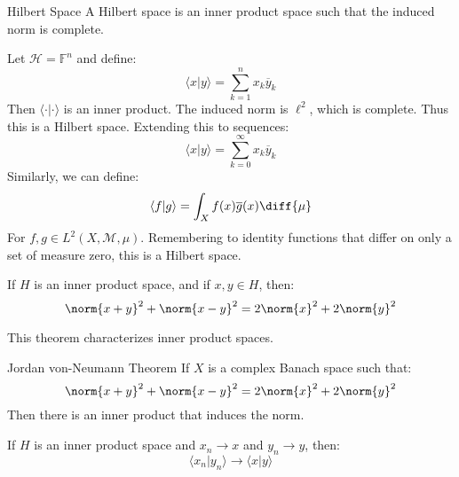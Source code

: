 \documentclass[crop=false,class=book,oneside]{standalone}                      %
\begin{document}
        \begin{ldefinition}{Hilbert Space}
            A Hilbert space is an inner product space
            such that the induced norm is complete.
        \end{ldefinition}
        \begin{lexample}
            Let $\mathcal{H}=\mathbb{F}^{n}$ and define:
            \begin{equation}
                \langle{x|y}\rangle
                =\sum_{k=1}^{n}x_{k}\overline{y}_{k}
            \end{equation}
            Then $\langle{\cdot|\cdot}\rangle$ is an inner product.
            The induced norm is $\ell^{2}$, which is complete.
            Thus this is a Hilbert space. Extending this to
            sequences:
            \begin{equation}
                \langle{x|y}\rangle
                =\sum_{k=0}^{\infty}x_{k}\overline{y}_{k}
            \end{equation}
            Similarly, we can define:
            \begin{equation}
                \langle{f|g}\rangle
                =\int_{X}f(x)\overline{g}(x)\diff{\mu}
            \end{equation}
            For $f,g\in{L}^{2}(X,\mathcal{M},\mu)$. Remembering
            to identity functions that differ on only a set
            of measure zero, this is a Hilbert space.
        \end{lexample}
        \begin{theorem}
            If $H$ is an inner product space, and if
            $x,y\in{H}$, then:
            \begin{equation}
                \norm{x+y}^{2}+\norm{x-y}^{2}=
                2\norm{x}^{2}+2\norm{y}^{2}
            \end{equation}
        \end{theorem}
        This theorem characterizes inner product spaces.
        \begin{ltheorem}{Jordan von-Neumann Theorem}
            If $X$ is a complex Banach space such that:
            \begin{equation}
                \norm{x+y}^{2}+\norm{x-y}^{2}
                =2\norm{x}^{2}+2\norm{y}^{2}
            \end{equation}
            Then there is an inner product that induces
            the norm.
        \end{ltheorem}
        \begin{theorem}
            If $H$ is an inner product space and
            $x_{n}\rightarrow{x}$ and
            $y_{n}\rightarrow{y}$, then:
            \begin{equation}
                \langle{x_{n}|y_{n}}\rangle
                \rightarrow\langle{x|y}\rangle
            \end{equation}
        \end{theorem}
\end{document}
